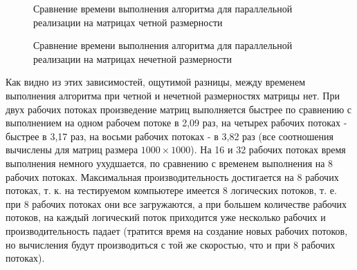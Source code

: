 \documentclass[a4paper,14pt]{article}
\begin{document}
        \begin{figure}[h!]
            \caption{Сравнение времени выполнения алгоритма для параллельной реализации на матрицах четной размерности}
            \label{fig:gtaf_1}
        \end{figure}
        
        
        \begin{figure}[h!]
            \caption{Сравнение времени выполнения алгоритма для параллельной реализации на матрицах нечетной размерности}
            \label{fig:graf_2}
        \end{figure}
        
        Как видно из этих зависимостей, ощутимой разницы, между временем выполнения алгоритма при четной и нечетной размерностях матрицы нет. При двух рабочих потоках произведение матриц выполняется быстрее по сравнению с выполнением на одном рабочем потоке в 2,09 раз, на четырех рабочих потоках - быстрее в 3,17 раз, на восьми рабочих потоках - в 3,82 раз (все соотношения вычислены для матриц размера $1000 \times 1000$). На 16 и 32 рабочих потоках время выполнения немного ухудшается, по сравнению с временем выполнения на 8 рабочих потоках. Максимальная производительность достигается на 8 рабочих потоках, т. к. на тестируемом компьютере имеется 8 логических потоков, т. е. при 8 рабочих потоках они все загружаются, а при большем количестве рабочих потоков, на каждый логический поток приходится уже несколько рабочих и производительность падает (тратится время на создание новых рабочих потоков, но вычисления будут производиться с той же скоростью, что и при 8 рабочих потоках).
        
\end{document}
